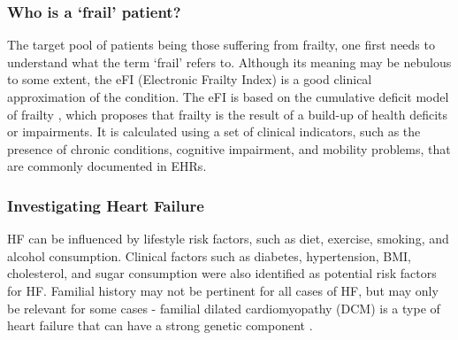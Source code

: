 \documentclass[%
 reprint,
 amsmath,amssymb,
 aps,
 nofootinbib,
]{revtex4-2}
\theoremstyle{definition}
\begin{document}
\subsubsection{\label{frail}Who is a `frail' patient?}
The target pool of patients being those suffering from frailty, one first needs to understand what the term `frail' refers to. Although its meaning may be nebulous to some extent, the eFI (Electronic Frailty Index) is a good clinical approximation of the condition. The eFI is based on the cumulative deficit model of frailty \citep{NHS}, which proposes that frailty is the result of a build-up of health deficits or impairments. It is calculated using a set of clinical indicators, such as the presence of chronic conditions, cognitive impairment, and mobility problems, that are commonly documented in EHRs.
\subsubsection{\label{hf}Investigating Heart Failure}
HF can be influenced by lifestyle risk factors, such as diet, exercise, smoking, and alcohol consumption. Clinical factors such as diabetes, hypertension, BMI, cholesterol, and sugar consumption were also identified as potential risk factors for HF. Familial history may not be pertinent for all cases of HF, but may only be relevant for some cases - familial dilated cardiomyopathy (DCM) is a type of heart failure that can have a strong genetic component \citep{peters2020familial}.
\end{document}
